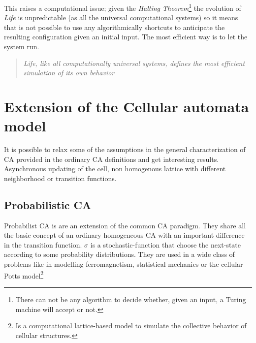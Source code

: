 This raises a computational issue; given the \emph{Halting
Theorem}\footnote{There can not be any algorithm to decide whether, given an
input, a Turing machine will accept or not.} the evolution of \emph{Life} is
unpredictable (as all the universal computational systems) so it means that is
not possible to use any algorithmically shortcuts to anticipate the resulting
configuration given an initial input. The most efficient way is to let the
system run.

\begin{quotation}
\em Life, like all computationally universal systems, defines the most efficient
simulation of its own behavior\cite{Ilachinski2001}
\end{quotation}





\section{Extension of the Cellular automata model}
It is possible to relax some of the assumptions in the general characterization
of CA provided in the ordinary CA definitions and get interesting results.
Asynchronous updating of the cell, non homogenous lattice with different
neighborhood or transition functions.

\subsection{Probabilistic CA}
Probabilist CA is are an extension of the common CA paradigm. They share all
the basic concept of an ordinary homogeneous
CA with an important difference in the transition function.
\begin{math}\sigma\end{math} is a stochastic-function that choose the next-state
according to some probability distributions. They are used in a wide class of
problems like in modelling ferromagnetism, statistical mechanics
\cite{Vichniac1984} or the cellular Potts model\footnote{Is a computational
lattice-based model to simulate the collective behavior of cellular structures.}


